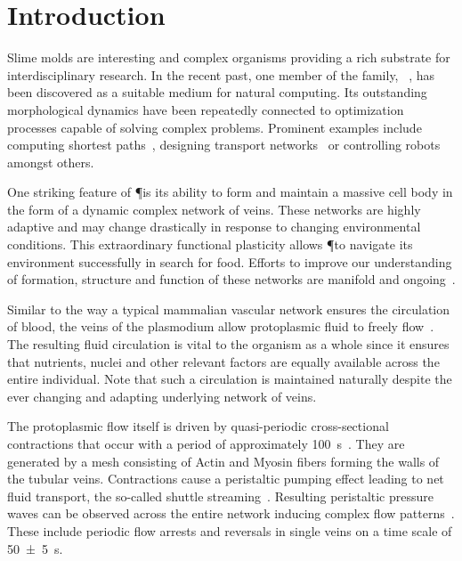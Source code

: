
\section{Introduction}

  Slime molds are interesting and complex organisms providing a rich substrate for interdisciplinary research. In the recent past, one member of the family, \Pp~\cite{howard1931life}, has been discovered as a suitable medium for natural computing. Its outstanding morphological dynamics have been repeatedly connected to optimization processes capable of solving complex problems. Prominent examples include computing shortest paths~\cite{nakagaki2000intelligence,tero2006physarum,bonifaci2012physarum}, designing transport networks~\cite{tero2010rules,nakagaki2007minimum} or controlling robots~\cite{tsuda2004robust} amongst others. 

  One striking feature of \P is its ability to form and maintain a massive cell body in the form of a dynamic complex network of veins. These networks are highly adaptive and may change drastically in response to changing environmental conditions. This extraordinary functional plasticity allows \P to navigate its environment successfully in search for food. Efforts to improve our understanding of formation, structure and function of these networks are manifold and ongoing~\cite{Marwan419,tero2010rules,alim2013random,baumgarten2010plasmodial,baumgarten2013functional}.

  Similar to the way a typical mammalian vascular network ensures the circulation of blood, the veins of the plasmodium allow protoplasmic fluid to freely flow~\cite{kamiya1958studies}. The resulting fluid circulation is vital to the organism as a whole since it ensures that nutrients, nuclei and other relevant factors are equally available across the entire individual. Note that such a circulation is maintained naturally despite the ever changing and adapting underlying network of veins. 

  The protoplasmic flow itself is driven by quasi-periodic cross-sectional contractions that occur with a period of approximately \SI{100}{\second}~\cite{stewart1959protoplasmic,Wohlfarth-Bottermann15}. They are generated by a mesh consisting of Actin and Myosin fibers forming the walls of the tubular veins. Contractions cause a peristaltic pumping effect leading to net fluid transport, the so-called shuttle streaming~\cite{kamiya1959motive}. Resulting peristaltic pressure waves can be observed across the entire network inducing complex flow patterns~\cite{Nakagaki2000195}. These include periodic flow arrests and reversals in single veins on a time scale of \SI{50 \pm 5}{\second}. 

